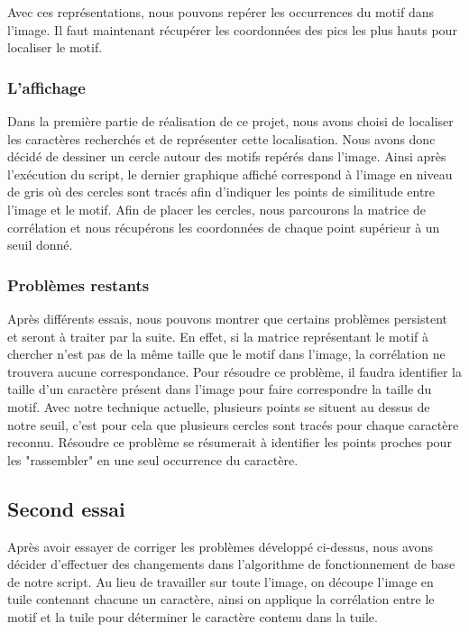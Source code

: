 \documentclass[a4paper,12pt,titlepage]{report}
\begin{document}
		Avec ces représentations, nous pouvons repérer les occurrences du motif dans l'image. Il faut maintenant récupérer les coordonnées des pics les plus hauts pour localiser le motif.
		\subsubsection{L'affichage}
		Dans la première partie de réalisation de ce projet, nous avons choisi de localiser les caractères recherchés et de représenter cette localisation. Nous avons donc décidé de dessiner un cercle autour des motifs repérés dans l'image.
		Ainsi après l'exécution du script, le dernier graphique affiché correspond à l'image en niveau de gris où des cercles sont tracés afin d'indiquer les points de similitude entre l'image et le motif.
		Afin de placer les cercles, nous parcourons la matrice de corrélation et nous récupérons les coordonnées de chaque point supérieur à un seuil donné. 

		\subsubsection{Problèmes restants}
		Après différents essais, nous pouvons montrer que certains problèmes persistent et seront à traiter par la suite.
		En effet, si la matrice représentant le motif à chercher n'est pas de la même taille que le motif dans l'image, la corrélation ne trouvera aucune correspondance. Pour résoudre ce problème, il faudra identifier la taille d'un caractère présent dans l'image pour faire correspondre la taille du motif.
		Avec notre technique actuelle, plusieurs points se situent au dessus de notre seuil, c'est pour cela que plusieurs cercles sont tracés pour chaque caractère reconnu. Résoudre ce problème se résumerait à identifier les points proches pour les "rassembler" en une seul occurrence du caractère.
	\subsection{Second essai}
	\label{essai2}
	Après avoir essayer de corriger les problèmes développé ci-dessus, nous avons décider d'effectuer des changements dans l’algorithme de fonctionnement de base de notre script. Au lieu de travailler sur toute l'image, on découpe l'image en tuile contenant chacune un caractère, ainsi on applique la corrélation entre le motif et la tuile pour déterminer le caractère contenu dans la tuile.
\end{document}
